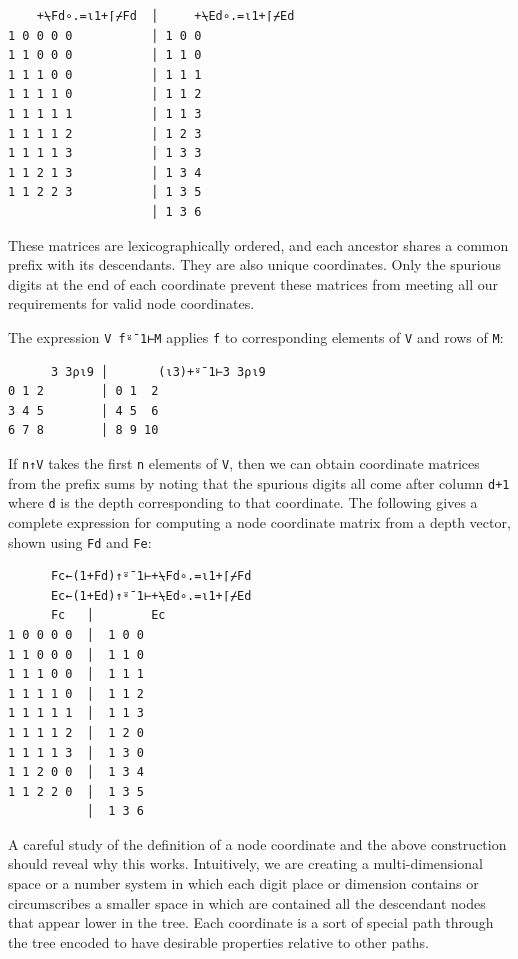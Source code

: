 ﻿\documentclass[numbers,10pt,preprint]{sigplanconf}
\begin{document}
\begin{verbatim}
    +⍀Fd∘.=⍳1+⌈⌿Fd  │     +⍀Ed∘.=⍳1+⌈⌿Ed
1 0 0 0 0           │ 1 0 0
1 1 0 0 0           │ 1 1 0
1 1 1 0 0           │ 1 1 1
1 1 1 1 0           │ 1 1 2
1 1 1 1 1           │ 1 1 3
1 1 1 1 2           │ 1 2 3
1 1 1 1 3           │ 1 3 3
1 1 2 1 3           │ 1 3 4
1 1 2 2 3           │ 1 3 5
                    │ 1 3 6
\end{verbatim}

\noindent These matrices are lexicographically ordered, and each ancestor shares a common prefix with its descendants. They are also unique coordinates. Only the spurious digits at the end of each coordinate prevent these matrices from meeting all our requirements for valid node coordinates.

The expression \verb;V f⍤¯1⊢M; applies \verb;f; to corresponding elements of \verb;V; and rows of \verb;M;:

\begin{verbatim}
      3 3⍴⍳9 │       (⍳3)+⍤¯1⊢3 3⍴⍳9
0 1 2        │ 0 1  2
3 4 5        │ 4 5  6
6 7 8        │ 8 9 10
\end{verbatim}

\noindent If \verb;n↑V; takes the first \verb;n; elements of \verb;V;, then we can obtain coordinate matrices from the prefix sums by noting that the spurious digits all come after column \verb;d+1; where \verb;d; is the depth corresponding to that coordinate. The following gives a complete expression for computing a node coordinate matrix from a depth vector, shown using \verb;Fd; and \verb;Fe;:

\begin{verbatim}
      Fc←(1+Fd)↑⍤¯1⊢+⍀Fd∘.=⍳1+⌈⌿Fd
      Ec←(1+Ed)↑⍤¯1⊢+⍀Ed∘.=⍳1+⌈⌿Ed
      Fc   │        Ec
1 0 0 0 0  │  1 0 0
1 1 0 0 0  │  1 1 0
1 1 1 0 0  │  1 1 1
1 1 1 1 0  │  1 1 2
1 1 1 1 1  │  1 1 3
1 1 1 1 2  │  1 2 0
1 1 1 1 3  │  1 3 0
1 1 2 0 0  │  1 3 4
1 1 2 2 0  │  1 3 5
           │  1 3 6
\end{verbatim}

A careful study of the definition of a node coordinate and the above construction should reveal why this works. Intuitively, we are creating a multi-dimensional space or a number system in which each digit place or dimension contains or circumscribes a smaller space in which are contained all the descendant nodes that appear lower in the tree. Each coordinate is a sort of special path through the tree encoded to have desirable properties relative to other paths.
\end{document}
